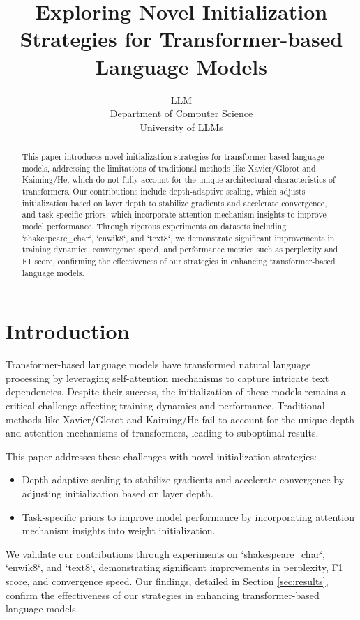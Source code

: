 \documentclass{article} %
\title{Exploring Novel Initialization Strategies for Transformer-based Language Models}
\author{LLM\\
Department of Computer Science\\
University of LLMs\\
}
\begin{document}
\maketitle

\begin{abstract}
This paper introduces novel initialization strategies for transformer-based language models, addressing the limitations of traditional methods like Xavier/Glorot and Kaiming/He, which do not fully account for the unique architectural characteristics of transformers. Our contributions include depth-adaptive scaling, which adjusts initialization based on layer depth to stabilize gradients and accelerate convergence, and task-specific priors, which incorporate attention mechanism insights to improve model performance. Through rigorous experiments on datasets including `shakespeare\_char`, `enwik8`, and `text8`, we demonstrate significant improvements in training dynamics, convergence speed, and performance metrics such as perplexity and F1 score, confirming the effectiveness of our strategies in enhancing transformer-based language models.
\end{abstract}

\section{Introduction}
\label{sec:intro}
Transformer-based language models have transformed natural language processing by leveraging self-attention mechanisms to capture intricate text dependencies. Despite their success, the initialization of these models remains a critical challenge affecting training dynamics and performance. Traditional methods like Xavier/Glorot and Kaiming/He fail to account for the unique depth and attention mechanisms of transformers, leading to suboptimal results.

This paper addresses these challenges with novel initialization strategies:
\begin{itemize}
    \item Depth-adaptive scaling to stabilize gradients and accelerate convergence by adjusting initialization based on layer depth.
    \item Task-specific priors to improve model performance by incorporating attention mechanism insights into weight initialization.
\end{itemize}

We validate our contributions through experiments on `shakespeare\_char`, `enwik8`, and `text8`, demonstrating significant improvements in perplexity, F1 score, and convergence speed. Our findings, detailed in Section \ref{sec:results}, confirm the effectiveness of our strategies in enhancing transformer-based language models.
\end{document}
